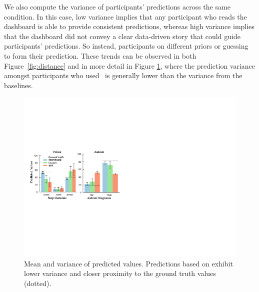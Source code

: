 \par We also compute the variance of participants' predictions across the same condition. In this case, low variance implies that any participant who reads the dashboard is able to provide consistent predictions, whereas high variance implies that the dashboard did not convey a clear data-driven story that could guide participants' predictions. So instead, participants  on different priors or guessing to form their prediction. These trends can be observed in both Figure~\ref{fig:distance} and in more detail in Figure \ref{fig:actual_predictions}, where the prediction variance amongst participants who used \system\ is generally lower than the variance from the baselines.
\begin{figure}[h!]
\centering
\includegraphics[width=0.85\linewidth]{figures/prediction.pdf}
\caption{Mean and variance of predicted values. Predictions based on \system exhibit lower variance  and closer proximity to the ground truth values (dotted).}
\label{fig:actual_predictions}
\end{figure}
